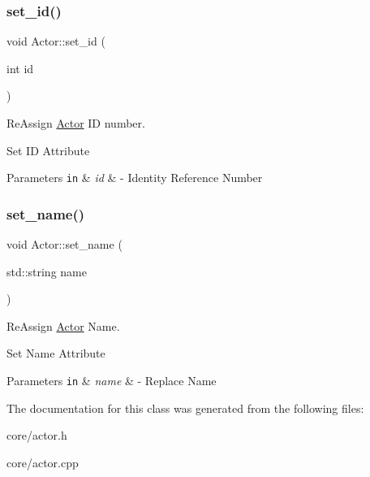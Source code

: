 \subsubsection{\texorpdfstring{set\+\_\+id()}{set\_id()}}
{\footnotesize\ttfamily void Actor\+::set\+\_\+id (\begin{DoxyParamCaption}\item[{int}]{id }\end{DoxyParamCaption})}



Re\+Assign \mbox{\hyperlink{classActor}{Actor}} ID number. 

Set ID Attribute 
\begin{DoxyParams}[1]{Parameters}
\mbox{\tt in}  & {\em id} & -\/ Identity Reference Number \\
\hline
\end{DoxyParams}
\mbox{\label{classActor_a7bf5eaa29d6275591d35fd43f67dd7be}} 
\subsubsection{\texorpdfstring{set\+\_\+name()}{set\_name()}}
{\footnotesize\ttfamily void Actor\+::set\+\_\+name (\begin{DoxyParamCaption}\item[{std\+::string}]{name }\end{DoxyParamCaption})}



Re\+Assign \mbox{\hyperlink{classActor}{Actor}} Name. 

Set Name Attribute 
\begin{DoxyParams}[1]{Parameters}
\mbox{\tt in}  & {\em name} & -\/ Replace Name \\
\hline
\end{DoxyParams}


The documentation for this class was generated from the following files\+:\begin{DoxyCompactItemize}
\item 
core/actor.\+h\item 
core/actor.\+cpp\end{DoxyCompactItemize}
